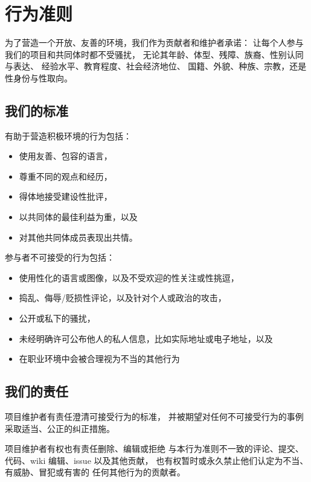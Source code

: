 \chapter{行为准则}\label{s:conduct} 

为了营造一个开放、友善的环境，我们作为贡献者和维护者承诺：
让每个人参与我们的项目和共同体时都不受骚扰，
无论其年龄、体型、残障、族裔、性别认同与表达、
经验水平、教育程度、社会经济地位、
国籍、外貌、种族、宗教，还是性身份与性取向。

\section*{我们的标准}

有助于营造积极环境的行为包括：

\begin{itemize}
\item
  使用友善、包容的语言，
\item
  尊重不同的观点和经历，
\item
  得体地接受建设性批评，
\item
  以共同体的最佳利益为重，以及
\item
  对其他共同体成员表现出共情。
\end{itemize}

\noindent
参与者不可接受的行为包括：

\begin{itemize}
\item
  使用性化的语言或图像，以及不受欢迎的性关注或性挑逗，
\item
  捣乱、侮辱/贬损性评论，以及针对个人或政治的攻击，
\item
  公开或私下的骚扰，
\item
  未经明确许可公布他人的私人信息，比如实际地址或电子地址，以及
\item
  在职业环境中会被合理视为不当的其他行为
\end{itemize}

\section*{我们的责任}

项目维护者有责任澄清可接受行为的标准，
并被期望对任何不可接受行为的事例
采取适当、公正的纠正措施。

项目维护者有权也有责任删除、编辑或拒绝
与本行为准则不一致的评论、提交、代码、wiki 编辑、issue 以及其他贡献，
也有权暂时或永久禁止他们认定为不当、有威胁、冒犯或有害的
任何其他行为的贡献者。

